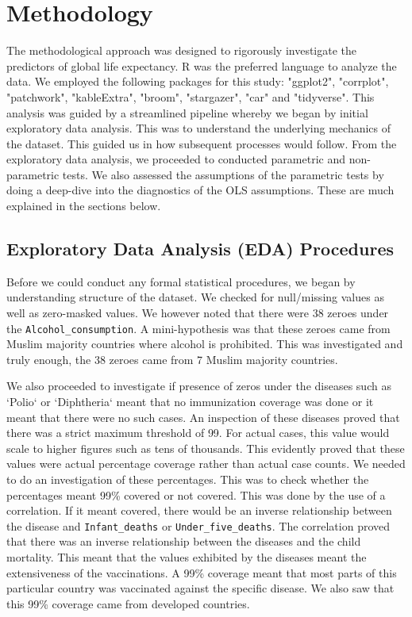 \documentclass[3pt, a4paper]{article}
\begin{document}
\section{Methodology}

The methodological approach was designed to rigorously investigate the predictors of global life expectancy. R was the preferred language to analyze the data. We employed the following packages for this study: "ggplot2", "corrplot", "patchwork", "kableExtra", "broom", "stargazer", "car" and "tidyverse". This analysis was guided by a streamlined pipeline whereby we began by initial exploratory data analysis. This was to understand the underlying mechanics of the dataset. This guided us in how subsequent processes would follow. From the exploratory data analysis, we proceeded to conducted parametric and non-parametric tests. We also assessed the assumptions of the parametric tests by doing a deep-dive into the diagnostics of the OLS assumptions. These are much explained in the sections below.

\subsection{Exploratory Data Analysis (EDA) Procedures}
Before we could conduct any formal statistical procedures, we began by understanding structure of the dataset. We checked for null/missing values as well as zero-masked values. We however noted that there were 38 zeroes under the \texttt{Alcohol\_consumption}. A mini-hypothesis was that these zeroes came from Muslim majority countries where alcohol is prohibited. This was investigated and truly enough, the 38 zeroes came from 7 Muslim majority countries. 

We also proceeded to investigate if presence of zeros under the diseases such as `Polio` or `Diphtheria` meant that no immunization coverage was done or it meant that there were no such cases. An inspection of these diseases proved that there was a strict maximum threshold of 99. For actual cases, this value would scale to higher figures such as tens of thousands. This evidently proved that these values were actual percentage coverage rather than actual case counts. We needed to do an investigation of these percentages. This was to check whether the percentages meant 99\% covered or not covered. This was done by the use of a correlation. If it meant covered, there would be an inverse relationship between the disease and \texttt{Infant\_deaths} or \texttt{Under\_five\_deaths}. The correlation proved that there was an inverse relationship between the diseases and the child mortality. This meant that the values exhibited by the diseases meant the extensiveness of
the vaccinations. A 99\% coverage meant that most parts of this particular country was vaccinated against the specific disease. We also saw that this 99\% coverage came from developed countries.
\end{document}
